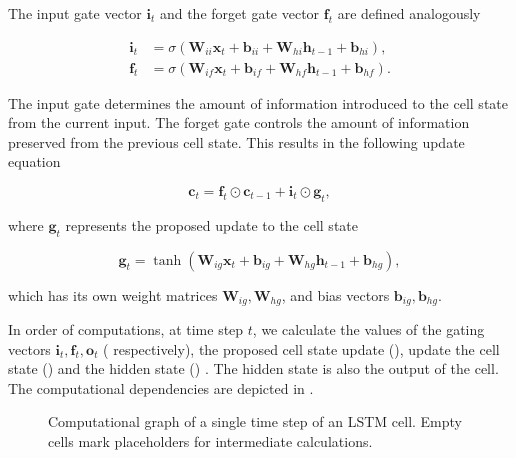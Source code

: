 The input gate vector $\pmb{i}_t$ and the forget gate vector $\pmb{f}_t$ are defined analogously

\begin{align}
  \pmb{i}_t &= \sigma (\pmb{W}_{ii} \pmb{x}_t + \pmb{b}_{ii} + \pmb{W}_{hi} \pmb{h}_{t-1} + \pmb{b}_{hi}), \label{eq:lstm_input_gate}\\
  \pmb{f}_t &= \sigma (\pmb{W}_{if} \pmb{x}_t + \pmb{b}_{if} + \pmb{W}_{hf} \pmb{h}_{t-1} + \pmb{b}_{hf}). \label{eq:lstm_forget_gate}
\end{align}

The input gate determines the amount of information introduced to the cell state from the current input. The forget gate controls the amount of information preserved from the previous cell state. This results in the following update equation

\begin{equation}
  \pmb{c}_t = \pmb{f}_t \odot \pmb{c}_{t-1} + \pmb{i}_t \odot \pmb{g}_t,
  \label{eq:lstm_cell_update}
\end{equation}

where $\pmb{g}_t$ represents the proposed update to the cell state

\begin{equation}
  \pmb{g}_t = \tanh (\pmb{W}_{ig} \pmb{x}_t + \pmb{b}_{ig} + \pmb{W}_{hg} \pmb{h}_{t-1} + \pmb{b}_{hg}),
  \label{eq:lstm_proposed_update}
\end{equation}

which has its own weight matrices $\pmb{W}_{ig}, \pmb{W}_{hg}$, and bias vectors $\pmb{b}_{ig}, \pmb{b}_{hg}$.

In order of computations, at time step $t$, we calculate the values of the gating vectors $\pmb{i}_t, \pmb{f}_t, \pmb{o}_t$ ( respectively), the proposed cell state update (), update the cell state () and the hidden state () \cite{Pytorch}. The hidden state is also the output of the cell. The computational dependencies are depicted in .

\begin{figure}
  \centering
  \def\svgwidth{\columnwidth}
  
  \caption{Computational graph of a single time step of an \ac{LSTM} cell. Empty cells mark placeholders for intermediate calculations.}
  \label{fig:lstm_memory_cell}
\end{figure}

